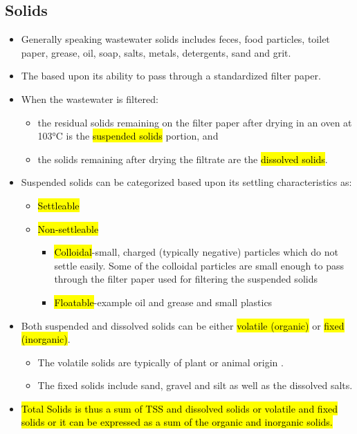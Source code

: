 \subsection{Solids}
		\begin{itemize}
		\item Generally speaking wastewater solids includes feces, food particles, toilet paper, grease, oil, soap, salts, metals, detergents, sand and grit.
			\item The  based upon its ability to pass through a standardized filter paper.
			\item When the wastewater is filtered:
			      \begin{itemize}
			      	\item the residual solids remaining on the filter paper after drying in an oven at 103\si{\degree}C is the \hl{suspended solids} portion, and 
			      	\item the solids remaining after drying the filtrate are the \hl{dissolved solids}.
			      \end{itemize}
			\item Suspended solids can be categorized based upon its settling characteristics as:
			      \begin{itemize}
			      	\item \hl{Settleable}
			      	\item \hl{Non-settleable}
			      	      \begin{itemize}
			      	      	\item \hl{Colloidal}-small, charged (typically negative) particles which do not settle easily.  Some of the colloidal particles are small enough to pass through the filter paper used for filtering the suspended solids
			      	      	\item \hl{Floatable}-example oil and grease and small plastics
			      	      \end{itemize}
			      \end{itemize}
			\item Both suspended and dissolved solids can be either \hl{volatile (organic)} or \hl{fixed (inorganic)}.

			      \begin{itemize}
			      	\item The volatile solids are typically of plant or animal origin .
			      	\item The fixed solids include sand, gravel and silt as well as the dissolved salts.
			      \end{itemize}
			     \item \hl{Total Solids is thus a sum of TSS and dissolved solids or volatile and fixed solids or it can be expressed as a sum of the organic and inorganic solids.}
			      \end{itemize}

